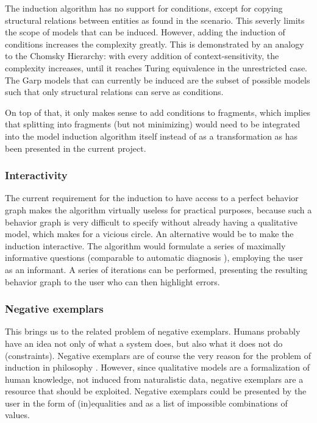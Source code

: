 \documentclass{article} %
\begin{document}
The induction algorithm has no support for conditions, except for
copying structural relations between entities as found in the scenario. This
severly limits the scope of models that can be induced. However, adding the
induction of conditions increases the complexity greatly. This is demonstrated
by an analogy to the Chomsky Hierarchy: with every addition of
context-sensitivity, the complexity increases, until it reaches Turing
equivalence in the unrestricted case. The Garp models that can currently be
induced are the subset of possible models such that only structural relations
can serve as conditions. 

On top of that, it only makes sense to add conditions to fragments, which
implies that splitting into fragments (but not minimizing) would need to be
integrated into the model induction algorithm itself instead of as a
transformation as has been presented in the current project.

\subsubsection{Interactivity}

The current requirement for the induction to have access to a perfect behavior
graph makes the algorithm virtually useless for practical purposes, because
such a behavior graph is very difficult to specify without already having a
qualitative model, which makes for a vicious circle. An alternative would be
to make the induction interactive. The algorithm would formulate a series of
maximally informative questions (comparable to automatic diagnosis
\cite{dekleerdiag}), employing the user as an informant. A series of
iterations can be performed, presenting the resulting behavior graph to the
user who can then highlight errors.

\subsubsection{Negative exemplars}

This brings us to the related problem of negative exemplars. Humans probably
have an idea not only of what a system does, but also what it does not do
(constraints). Negative exemplars are of course the very reason for the
problem of induction in philosophy \cite{hume, popper}.
However, since qualitative models are a formalization of human knowledge, not
induced from naturalistic data, negative exemplars are a resource that should
be exploited. Negative exemplars could be presented by the user in the form of
(in)equalities and as a list of impossible combinations of values.
\end{document}
